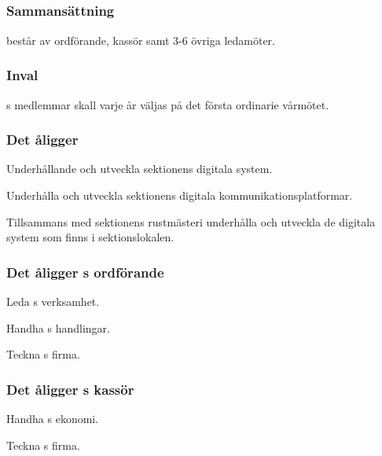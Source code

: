 \subsection{\DIGITFULL}
\subsubsection{Sammansättning}
\DIGIT{} består av ordförande, kassör samt 3-6 övriga ledamöter.

\subsubsection{Inval}
\DIGIT{}s medlemmar skall varje år väljas på det första ordinarie vårmötet.

\subsubsection{Det åligger \DIGIT}
\begin{att}
	\item Underhållande och utveckla sektionens digitala system.
	\item Underhålla och utveckla sektionens digitala kommunikationsplatformar.
	\item Tillsammans med sektionens rustmästeri underhålla och utveckla de digitala system som finns i sektionslokalen.
\end{att}

\subsubsection{Det åligger \DIGIT{}s ordförande}
\begin{att}
	\item Leda \DIGIT{}s verksamhet.
	\item Handha \DIGIT{}s handlingar.
	\item Teckna \DIGIT{}s firma.
\end{att}

\subsubsection{Det åligger \DIGIT{}s kassör}
\begin{att}
	\item Handha \DIGIT{}s ekonomi.
	\item Teckna \DIGIT{}s firma.
\end{att}